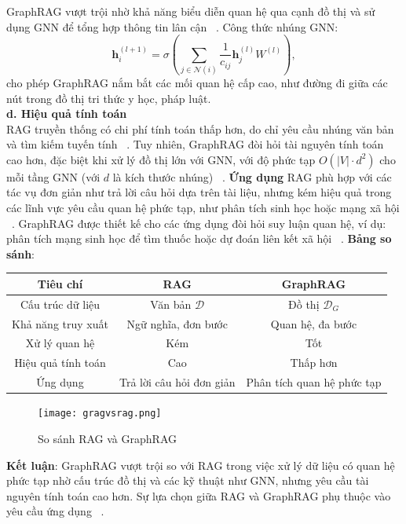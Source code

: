 \documentclass[a4paper]{article}
\begin{document}
GraphRAG vượt trội nhờ khả năng biểu diễn quan hệ qua cạnh đồ thị và sử dụng GNN để tổng hợp thông tin lân cận ~\cite{Wu2020GNN}. Công thức nhúng GNN:
\begin{equation}
    \mathbf{h}_i^{(l+1)} = \sigma \left( \sum_{j \in \mathcal{N}(i)} \frac{1}{c_{ij}} \mathbf{h}_j^{(l)} W^{(l)} \right),
\end{equation}
cho phép GraphRAG nắm bắt các mối quan hệ cấp cao, như đường đi giữa các nút trong đồ thị tri thức y học, pháp luật.\\
\textbf{d.  Hiệu quả tính toán\\}
RAG truyền thống có chi phí tính toán thấp hơn, do chỉ yêu cầu nhúng văn bản và tìm kiếm tuyến tính ~\cite{Karpukhin2020DPR}. Tuy nhiên, GraphRAG đòi hỏi tài nguyên tính toán cao hơn, đặc biệt khi xử lý đồ thị lớn với GNN, với độ phức tạp $O(|V| \cdot d^2)$ cho mỗi tầng GNN (với $d$ là kích thước nhúng) ~\cite{Wu2020GNN}.
\textbf{Ứng dụng} RAG phù hợp với các tác vụ đơn giản như trả lời câu hỏi dựa trên tài liệu, nhưng kém hiệu quả trong các lĩnh vực yêu cầu quan hệ phức tạp, như phân tích sinh học hoặc mạng xã hội ~\cite{Lewis2020RAG}. GraphRAG được thiết kế cho các ứng dụng đòi hỏi suy luận quan hệ, ví dụ: phân tích mạng sinh học để tìm thuốc hoặc dự đoán liên kết xã hội ~\cite{Chen2024GraphRAG}.
\textbf{Bảng so sánh}:
\begin{center}
\begin{tabular}{|c|c|c|}
\hline
\textbf{Tiêu chí} & \textbf{RAG} & \textbf{GraphRAG} \\
\hline
Cấu trúc dữ liệu & Văn bản $\mathcal{D}$ & Đồ thị $\mathcal{D}_G$ \\
Khả năng truy xuất & Ngữ nghĩa, đơn bước & Quan hệ, đa bước \\
Xử lý quan hệ & Kém & Tốt \\
Hiệu quả tính toán & Cao & Thấp hơn \\
Ứng dụng & Trả lời câu hỏi đơn giản & Phân tích quan hệ phức tạp \\
\hline
\end{tabular}
\end{center}
\begin{figure}[H]
    \centering
    \texttt{[image: gragvsrag.png]}
    \caption{So sánh RAG và GraphRAG}

\end{figure}

\textbf{Kết luận}: GraphRAG vượt trội so với RAG trong việc xử lý dữ liệu có quan hệ phức tạp nhờ cấu trúc đồ thị và các kỹ thuật như GNN, nhưng yêu cầu tài nguyên tính toán cao hơn. Sự lựa chọn giữa RAG và GraphRAG phụ thuộc vào yêu cầu ứng dụng ~\cite{Chen2024GraphRAG}.
\end{document}
